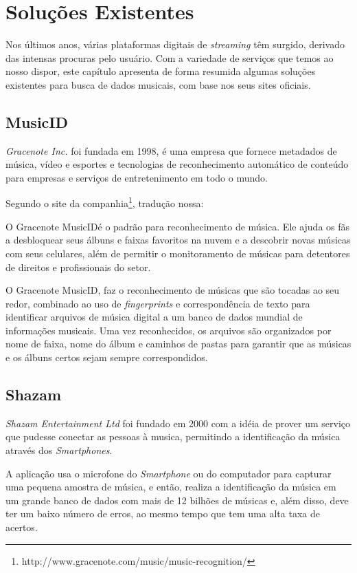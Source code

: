 \chapter{Soluções Existentes}
Nos últimos anos, várias plataformas digitais de \textit{streaming} têm surgido, derivado das intensas procuras pelo usuário. Com a variedade de serviços que temos ao nosso dispor, este capítulo apresenta de forma resumida algumas soluções existentes para busca de dados musicais, com base nos seus sites oficiais.

\section{MusicID}
\textit{Gracenote Inc.} foi fundada em 1998, é uma empresa que fornece metadados de música, vídeo e esportes e tecnologias de reconhecimento automático de conteúdo para empresas e serviços de entretenimento em todo o mundo.

Segundo o site da companhia\footnote{http://www.gracenote.com/music/music-recognition/}, tradução nossa:

\begin{citation}
O Gracenote MusicID\textregistered é o padrão para reconhecimento de música. Ele ajuda os fãs a desbloquear seus álbuns e faixas favoritos na nuvem e a descobrir novas músicas com seus celulares, além de permitir o monitoramento de músicas para detentores de direitos e profissionais do setor.
\end{citation}

O Gracenote MusicID\textregistered, faz o reconhecimento de músicas que são tocadas ao seu redor, combinado ao uso de \textit{fingerprints} e correspondência de texto para identificar arquivos de música digital a um banco de dados mundial de informações musicais. Uma vez reconhecidos, os arquivos são organizados por nome de faixa, nome do álbum e caminhos de pastas para garantir que as músicas e os álbuns certos sejam sempre correspondidos.

\section{Shazam}
\textit{Shazam Entertainment Ltd} foi fundado em 2000 com a idéia de prover um serviço que pudesse conectar as pessoas à musica, permitindo a identificação da música através dos \textit{Smartphones}.

A aplicação usa o microfone do \textit{Smartphone} ou do computador para capturar uma pequena amostra de música, e então, realiza a identificação da música em um grande banco de dados com mais de 12 bilhões de músicas e, além disso, deve ter um baixo número de erros, ao mesmo tempo que tem uma alta taxa de acertos.

